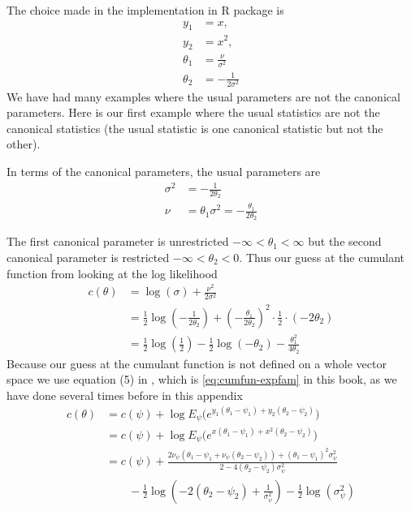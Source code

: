 The choice made in the implementation in R package  is
\begin{align*}
   y_1 & = x,
   \\
   y_2 & = x^2,
   \\
   \theta_1 & = \frac{\nu}{\sigma^2}
   \\
   \theta_2 & = - \frac{1}{2 \sigma^2}
\end{align*}
We have had many examples where the usual parameters are not the canonical
parameters.  Here is our first example where the usual statistics are not
the canonical statistics (the usual statistic is one canonical statistic
but not the other).

In terms of the canonical parameters, the usual parameters are
\begin{align*}
   \sigma^2 & = - \frac{1}{2 \theta_2}
   \\
   \nu & = \theta_1 \sigma^2 = - \frac{\theta_1}{2 \theta_2}
\end{align*}

The first canonical parameter is unrestricted $- \infty < \theta_1 < \infty$
but the second canonical parameter is restricted $- \infty < \theta_2 < 0$.
Thus our guess at the cumulant function from looking at the log likelihood
\begin{align*}
   c(\theta)
   & =
   \log(\sigma) + \frac{\nu^2}{2 \sigma^2}
   \\
   & =
   \frac{1}{2} \log\left(- \frac{1}{2 \theta_2}\right)
   +
   \left( - \frac{\theta_1}{2 \theta_2} \right)^2 \cdot \frac{1}{2}
   \cdot (- 2 \theta_2)
   \\
   & =
   \frac{1}{2} \log\left(\frac{1}{2}\right)
   -
   \frac{1}{2} \log(- \theta_2)
   -
   \frac{\theta_1^2}{4 \theta_2} 
\end{align*}
Because our guess at the cumulant function is not defined on a whole vector
space we use equation (5) in \citet{geyer-gdor}, which is \eqref{eq:cumfun-expfam}
in this book, as we have done several times before in this appendix
\begin{align*}
   c(\theta)
   & =
   c(\psi) + \log E_\psi
   \bigl( e^{y_1 (\theta_1 - \psi_1) + y_2 (\theta_2 - \psi_2)} \bigr)
   \\
   & =
   c(\psi) + \log E_\psi
   \bigl( e^{x (\theta_1 - \psi_1) + x^2 (\theta_2 - \psi_2)} \bigr)
   \\
   & =
   c(\psi) + \frac{2 \nu_\psi (\theta_1 - \psi_1 + \nu_\psi (\theta_2 - \psi_2))
   + (\theta_1 - \psi_1)^2 \sigma^2_\psi}
   {2 - 4 (\theta_2 - \psi_2) \sigma^2_\psi}
   \\
   & \qquad
   - \frac{1}{2} \log\left( - 2 (\theta_2 - \psi_2) + \frac{1}{\sigma^2_\psi}
   \right)
   - \frac{1}{2} \log\left( \sigma^2_\psi \right)
\end{align*}
%
%

